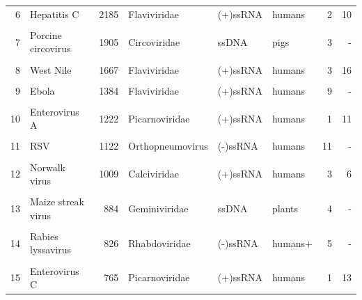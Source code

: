 \documentclass[landscape]{slides}
\begin{document}
\begin{slide}
\begin{center}
\begin{tabular}{r|l|r|l|l|l|r|r}
  6  & Hepatitis C         &        2185  & Flaviviridae   & (+)ssRNA & humans &     2 & 10       \\ %
     &                     &              &                &          &        &       &          \\ 
  7  & Porcine circovirus  &        1905  & Circoviridae   & ssDNA    & pigs   &     3 & -        \\ %
     &                     &              &                &          &        &       &          \\ 
  \textcolor{myorange}{8}  & \textcolor{myorange}{West Nile}           &        \textcolor{myorange}{1667}  & \textcolor{myorange}{Flaviviridae}   & \textcolor{myorange}{(+)ssRNA} & \textcolor{myorange}{humans} &     \textcolor{myorange}{3} & \textcolor{myorange}{16}       \\ %
     &                     &              &                &          &        &       &          \\ 
  9  & Ebola               &        1384  & Flaviviridae   & (+)ssRNA & humans &     9 & -        \\ %
     &                     &              &                &          &        &       &          \\ 
 10  & Enterovirus A       &        1222  & Picarnoviridae & (+)ssRNA & humans &     1 & 11       \\ %
     &                     &              &                &          &        &       &          \\ 
 11  & RSV                 &        1122  & Orthopneumovirus& (-)ssRNA& humans &    11 & -        \\ %
     &                     &              &                &          &        &       &          \\ 
 12  & Norwalk virus       &        1009  & Calciviridae   & (+)ssRNA & humans &     3 & 6        \\ %
     &                     &              &                &          &        &       &          \\ 
\textcolor{myorange}{13}  & \textcolor{myorange}{Maize streak virus}  &         \textcolor{myorange}{884}  & \textcolor{myorange}{Geminiviridae}  & \textcolor{myorange}{ssDNA}    & \textcolor{myorange}{plants} &     \textcolor{myorange}{4} & \textcolor{myorange}{-}        \\ %
     &                     &              &                &          &        &       &          \\ 
 14  & Rabies lyssavirus   &         826  & Rhabdoviridae  & (-)ssRNA & humans+&     5 & -        \\ %
     &                     &              &                &          &        &       &          \\ 
 15  & Enterovirus C       &         765  & Picarnoviridae & (+)ssRNA & humans &     1 & 13       \\ %
\end{tabular}


\end{center}
\end{slide}
\end{document}
